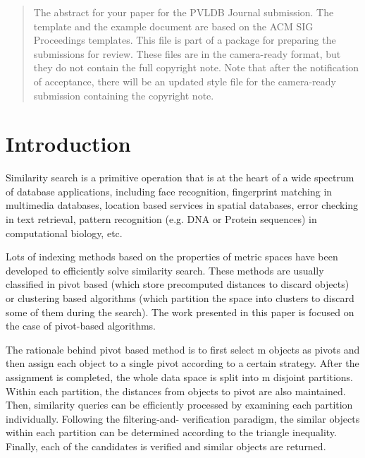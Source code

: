 \documentclass{vldb}
\begin{document}
\date{30 July 1999}




\maketitle
\newtheorem{myDef}{Definition} 
\newtheorem{myTheo}{Theorem}
\newtheorem{lem}{Lemma}

\begin{abstract}
The abstract for your paper for the PVLDB Journal submission.
The template and the example document are based on the ACM SIG Proceedings  templates. This file is part of a package for preparing the submissions for review. These files are in the camera-ready format, but they do not contain the full copyright note.
Note that after the notification of acceptance, there will be an updated style file for the camera-ready submission containing the copyright note.
\end{abstract}




\section{Introduction}
Similarity search is a primitive operation that is at the heart of a wide spectrum of database applications, including face recognition, fingerprint matching in multimedia databases, location based services in spatial databases, error checking in text retrieval, pattern recognition (e.g. DNA or Protein sequences) in computational biology, etc.

Lots of indexing methods based on the properties of metric spaces have been developed to efficiently solve similarity search. These methods are usually classified in pivot   based (which store precomputed distances to discard objects) or clustering   based algorithms (which partition the space into clusters to discard some of them during the search). The work presented in this paper is focused on the case of pivot-based algorithms.

The rationale behind pivot based method is to first select m objects as pivots and then assign each object to a single pivot according to a certain strategy. After the assignment is completed, the whole data space is split into m disjoint partitions. Within each partition, the distances from objects to pivot are also maintained. Then, similarity queries can be efficiently processed by examining each partition individually. Following the filtering-and- verification paradigm, the similar objects within each partition can be determined according to the triangle inequality. Finally, each of the candidates is verified and similar objects are returned.
\end{document}
